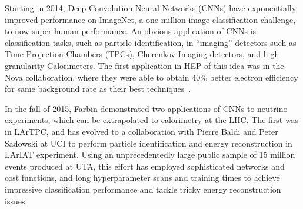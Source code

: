 

Starting in 2014, Deep Convolution Neural Networks (CNNs) have
exponentially improved performance on ImageNet, a one-million image
classification challenge\cite{ILSVRC15}, to now super-human
performance\cite{2015arXiv151203385H}.  An obvious application of CNNs is classification
tasks, such as particle identification, in ``imaging'' detectors such
as Time-Projection Chambers (TPCs), Cherenkov Imaging detectors, and
high granularity Calorimeters. The first application in HEP of this
idea was in the Nova collaboration, where they were able to obtain
40\% better electron efficiency for same background rate as their best
techniques~\cite{Aurisano:2016jvx}.


In the fall of 2015, Farbin demonstrated two applications of CNNs to
neutrino experiments, which can be extrapolated to calorimetry at the
LHC. The first was in LArTPC, and has evolved to a collaboration with
Pierre Baldi and Peter Sadowski at UCI to perform particle
identification and energy reconstruction in LArIAT experiment.  Using
an unprecedentedly large public sample of 15 million events produced
at UTA, this effort has employed sophisticated networks and cost
functions, and long hyperparameter scans and training times to achieve
impressive classification performance and tackle tricky energy
reconstruction issues. 


